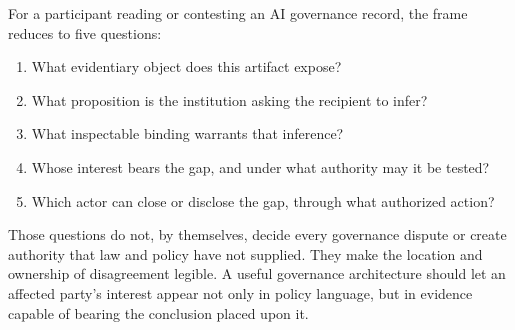 For a participant reading or contesting an AI governance record, the frame
reduces to five questions:

\begin{enumerate}
  \item What evidentiary object does this artifact expose?
  \item What proposition is the institution asking the recipient to infer?
  \item What inspectable binding warrants that inference?
  \item Whose interest bears the gap, and under what authority may it be tested?
  \item Which actor can close or disclose the gap, through what authorized action?
\end{enumerate}

Those questions do not, by themselves, decide every governance dispute or create authority that
law and policy have not supplied. They make the location and ownership of
disagreement legible. A useful governance architecture should let an affected
party's interest appear not only in policy language, but in evidence capable of
bearing the conclusion placed upon it.
